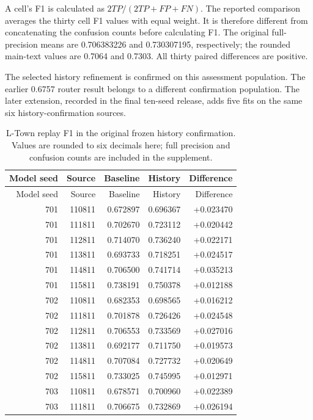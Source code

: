 A cell's F1 is calculated as $2TP/(2TP+FP+FN)$. The reported comparison averages the thirty cell F1 values with equal weight. It is therefore different from concatenating the confusion counts before calculating F1. The original full-precision means are 0.706383226 and 0.730307195, respectively; the rounded main-text values are 0.7064 and 0.7303. All thirty paired differences are positive.

The selected history refinement is confirmed on this assessment population. The earlier 0.6757 router result belongs to a different confirmation population. The later extension, recorded in the final ten-seed release, adds five fits on the same six history-confirmation sources.

\begin{longtable}{@{}rrrrr@{}}
\caption[Original thirty replay confirmation pairs]{L-Town replay F1 in the original frozen history confirmation. Values are rounded to six decimals here; full precision and confusion counts are included in the supplement.}\label{tab:historypairs}\\
\toprule Model seed & Source & Baseline & History & Difference\\\midrule\endfirsthead
\toprule Model seed & Source & Baseline & History & Difference\\\midrule\endhead
701 & 110811 & 0.672897 & 0.696367 & +0.023470\\
701 & 111811 & 0.702670 & 0.723112 & +0.020442\\
701 & 112811 & 0.714070 & 0.736240 & +0.022171\\
701 & 113811 & 0.693733 & 0.718251 & +0.024517\\
701 & 114811 & 0.706500 & 0.741714 & +0.035213\\
701 & 115811 & 0.738191 & 0.750378 & +0.012188\\
702 & 110811 & 0.682353 & 0.698565 & +0.016212\\
702 & 111811 & 0.701878 & 0.726426 & +0.024548\\
702 & 112811 & 0.706553 & 0.733569 & +0.027016\\
702 & 113811 & 0.692177 & 0.711750 & +0.019573\\
702 & 114811 & 0.707084 & 0.727732 & +0.020649\\
702 & 115811 & 0.733025 & 0.745995 & +0.012971\\
703 & 110811 & 0.678571 & 0.700960 & +0.022389\\
703 & 111811 & 0.706675 & 0.732869 & +0.026194\\

\end{longtable}
